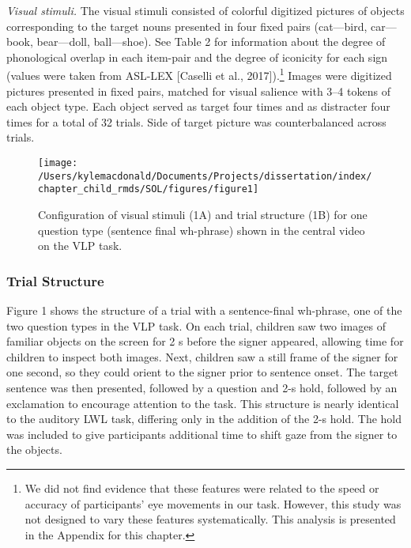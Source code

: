 \documentclass[oneside]{report}
\begin{document}
\emph{Visual stimuli.} The visual stimuli consisted of colorful
digitized pictures of objects corresponding to the target nouns
presented in four fixed pairs (cat---bird, car---book, bear---doll,
ball---shoe). See Table 2 for information about the degree of
phonological overlap in each item-pair and the degree of iconicity for
each sign (values were taken from ASL-LEX {[}Caselli et al.,
2017{]}).\footnote{We did not find evidence that these features were
  related to the speed or accuracy of participants' eye movements in our
  task. However, this study was not designed to vary these features
  systematically. This analysis is presented in the Appendix for this
  chapter.} Images were digitized pictures presented in fixed pairs,
matched for visual salience with 3--4 tokens of each object type. Each
object served as target four times and as distracter four times for a
total of 32 trials. Side of target picture was counterbalanced across
trials.
\begin{figure}[!t]

{\centering \texttt{[image: /Users/kylemacdonald/Documents/Projects/dissertation/index/chapter\_child\_rmds/SOL/figures/figure1]} 

}

\caption[Stimuli in the Visual Language Processing Task used in Experiment 1.1]{Configuration of visual stimuli (1A) and trial structure (1B) for one question type (sentence final wh-phrase) shown in the central video on the VLP task.}\label{fig:sol-trial-fig}
\end{figure}
\subsubsection{Trial Structure}\label{trial-structure}

Figure 1 shows the structure of a trial with a sentence-final wh-phrase,
one of the two question types in the VLP task. On each trial, children
saw two images of familiar objects on the screen for 2 s before the
signer appeared, allowing time for children to inspect both images.
Next, children saw a still frame of the signer for one second, so they
could orient to the signer prior to sentence onset. The target sentence
was then presented, followed by a question and 2-s hold, followed by an
exclamation to encourage attention to the task. This structure is nearly
identical to the auditory LWL task, differing only in the addition of
the 2-s hold. The hold was included to give participants additional time
to shift gaze from the signer to the objects.
\end{document}
